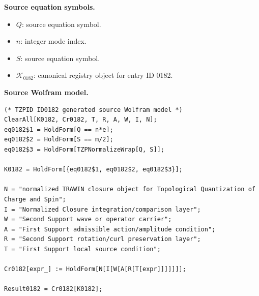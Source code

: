 \begin{minipage}[t]{0.49\linewidth}
\begingroup
\small
\raggedright
\textbf{Source equation symbols.}\par
\begin{itemize}[leftmargin=1.35em,itemsep=1pt,topsep=1pt,parsep=0pt]
    \item $Q$: source equation symbol.
    \item $n$: integer mode index.
    \item $S$: source equation symbol.
    \item $\mathcal{K}_{0182}$: canonical registry object for entry ID 0182.
\end{itemize}
\endgroup
\end{minipage}\hfill
\begin{minipage}[t]{0.47\linewidth}
\begingroup
\scriptsize
\raggedright
\textbf{Source Wolfram model.}\par
\begin{Verbatim}[fontsize=\tiny,breaklines=true,breakanywhere=true]
(* TZPID ID0182 generated source Wolfram model *)
ClearAll[K0182, Cr0182, T, R, A, W, I, N];
eq0182$1 = HoldForm[Q == n*e];
eq0182$2 = HoldForm[S == m/2];
eq0182$3 = HoldForm[TZPNormalizeWrap[Q, S]];

K0182 = HoldForm[{eq0182$1, eq0182$2, eq0182$3}];

N = "normalized TRAWIN closure object for Topological Quantization of Charge and Spin";
I = "Normalized Closure integration/comparison layer";
W = "Second Support wave or operator carrier";
A = "First Support admissible action/amplitude condition";
R = "Second Support rotation/curl preservation layer";
T = "First Support local source condition";

Cr0182[expr_] := HoldForm[N[I[W[A[R[T[expr]]]]]]];

Result0182 = Cr0182[K0182];
\end{Verbatim}
\endgroup
\end{minipage}

